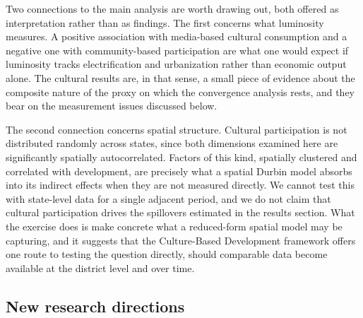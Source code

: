 \documentclass[
  a4paper, 
  twoside,
  final
]{article}
\begin{document}
Two connections to the main analysis are worth drawing out, both offered
as interpretation rather than as findings. The first concerns what
luminosity measures. A positive association with media-based cultural
consumption and a negative one with community-based participation are
what one would expect if luminosity tracks electrification and
urbanization rather than economic output alone. The cultural results
are, in that sense, a small piece of evidence about the composite nature
of the proxy on which the convergence analysis rests, and they bear on
the measurement issues discussed below.

The second connection concerns spatial structure. Cultural participation
is not distributed randomly across states, since both dimensions
examined here are significantly spatially autocorrelated. Factors of
this kind, spatially clustered and correlated with development, are
precisely what a spatial Durbin model absorbs into its indirect effects
when they are not measured directly. We cannot test this with
state-level data for a single adjacent period, and we do not claim that
cultural participation drives the spillovers estimated in the results
section. What the exercise does is make concrete what a reduced-form
spatial model may be capturing, and it suggests that the Culture-Based
Development framework offers one route to testing the question directly,
should comparable data become available at the district level and over
time.

\subsection{New research directions}\label{new-research-directions}
\end{document}
